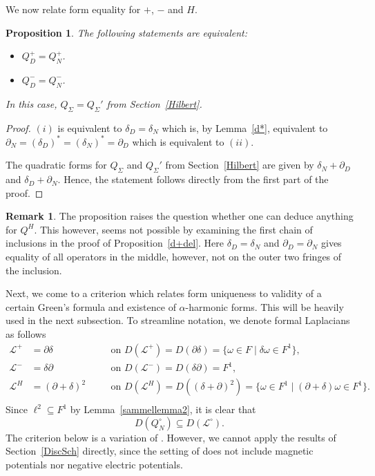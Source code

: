 \documentclass[10pt]{amsart}
\newtheorem{proposition}[theorem]{Proposition}
\theoremstyle{definition}
\newtheorem*{remark}{Remark}
\newcommand{\F}{{F}}
\renewcommand{\bullet}{{\circ}}
\newcommand{\Hmm}[1]{\leavevmode{\marginpar{\tiny%
			$\hbox to 0mm{\hspace*{-0.5mm}$\leftarrow$\hss}%
			\vcenter{\vrule depth 0.1mm height 0.1mm width \the\marginparwidth}%
			\hbox to 0mm{\hss$\rightarrow$\hspace*{-0.5mm}}$\\\relax\raggedright #1}}}
\begin{document}
We now relate form equality for $+$, $-$ and $H$.
\begin{proposition}\label{Q+Q-}The following statements are equivalent:
	\begin{itemize}	\item[(i)] $Q^+_{D} = Q^+_N$.
			\item[(ii)] $Q^-_{D} = Q^-_N$.
	\end{itemize}
	In this case, $Q_{\Sigma} = Q_\Sigma'$ from Section~\ref{Hilbert}.
\end{proposition}
\begin{proof}
	$(i)$  is equivalent to $\delta_{D}=\delta_{N}$ which is, by Lemma~\ref{d*}, equivalent to $\partial_{N}=(\delta_{D})^{*}=(\delta_{N})^{*} = \partial_D$ which is equivalent to $(ii)$.
	
	The quadratic forms for $Q_{\Sigma}$ and $Q_\Sigma'$ from Section~\ref{Hilbert} are given by $\delta_{N}+\partial_{D}$ and $\delta_{D}+\partial_{N}$. Hence, the statement follows directly from the first part of the proof.
\end{proof}


\begin{remark}The proposition raises the question whether one can deduce anything for $Q^{H}$. This however, seems not possible by examining the first chain of inclusions in the proof of Proposition~\ref{d+del}. Here $\delta_{D}=\delta_{N}$ and $\partial_{D}=\partial_{N}$ gives equality of all operators in the middle, however, not on the outer two fringes of the inclusion.%
\end{remark}

Next, we come to a criterion which relates form uniqueness to validity of a certain Green's formula and existence of $\alpha$-harmonic forms. This will be heavily used in the next subsection. To streamline notation, we denote formal Laplacians as follows
\begin{align*}
	\mathcal{L}^+ &= \partial\delta\quad&&\mbox{on }D(\mathcal{L}^+) = D(\partial\delta)=\lbrace\omega\in \F\mid\delta\omega\in \F^1\rbrace,\\
	\mathcal{L}^- &= \delta\partial\quad&&\mbox{on }D(\mathcal{L}^-) = D(\delta\partial)=\F^1,\\
	\mathcal{L}^H &= (\partial+\delta)^2\quad&&\mbox{on }D(\mathcal{L}^H) =  D((\delta+\partial)^{2})=\lbrace \omega\in \F^1\mid (\partial+\delta)\omega\in \F^1\rbrace.\\
\end{align*}
Since $\ell^{2}\subseteq F^{1}$ by Lemma~\ref{sammellemma2}, it is clear that $$D(Q^{\bullet}_{N})\subseteq D(\mathcal{L}^{\bullet}).$$ 
The criterion below is a variation of \cite[Theorem 3.2]{KLW}. However, we cannot  apply the results of Section~\ref{DiscSch} directly, since the setting of \cite{KLW} does not include magnetic potentials nor negative electric potentials.
\end{document}
